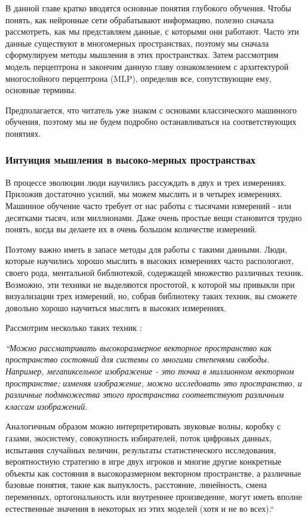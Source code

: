 В данной главе кратко вводятся основные понятия глубокого обучения. 
Чтобы понять, как нейронные сети обрабатывают информацию, 
полезно сначала рассмотреть, как мы представляем данные, 
с которыми они работают. Часто эти данные существуют в многомерных пространствах, 
поэтому мы сначала сформулируем методы мышления в этих пространствах.
Затем рассмотрим модель перцептрона и закончим данную главу ознакомлением с 
архитектурой многослойного перцептрона (MLP), 
определив все, сопутствующие ему, основные термины.

Предполагается, что читатель уже знаком с основами классического машинного обучения, 
поэтому мы не будем подробно останавливаться на соответствующих понятиях.

\subsubsection{Интуиция мышления в высоко-мерных пространствах}

В процессе эволюции люди научились рассуждать в двух и трех измерениях. 
Приложив достаточно усилий, мы можем мыслить и в четырех измерениях. 
Машинное обучение часто требует от нас работы с тысячами измерений - 
или десятками тысяч, или миллионами. Даже очень простые вещи становится 
трудно понять, когда вы делаете их в очень большом количестве измерений.

Поэтому важно иметь в запасе методы для работы с такими данными. 
Люди, которые научились хорошо мыслить в высоких измерениях часто 
распологают, своего рода, ментальной библиотекой, содержащей множество 
различных техник. Возможно, эти техники не выделяются простотой, 
к которой мы привыкли при визуализации трех измерений, но, 
собрав библиотеку таких техник, вы сможете довольно хорошо научиться 
мыслить в высоких измерениях.

Рассмотрим несколько таких техник \cite{ndim_thinking}:

\begin{quoting}
    \itshape
    “Можно рассматривать высокоразмерное векторное пространство как 
    пространство состояний для системы со многими степенями свободы. 
    Например, мегапиксельное изображение - это точка в миллионном 
    векторном пространстве; изменяя изображение, можно исследовать 
    это пространство, и различные подмножества этого пространства 
    соответствуют различным классам изображений.

    Аналогичным образом можно интерпретировать звуковые волны, 
    коробку с газами, экосистему, совокупность избирателей, поток 
    цифровых данных, испытания случайных величин, результаты 
    статистического исследования, вероятностную стратегию в игре 
    двух игроков и многие другие конкретные объекты как состояния 
    в высокоразмерном векторном пространстве, а различные базовые 
    понятия, такие как выпуклость, расстояние, линейность, смена 
    переменных, ортогональность или внутреннее произведение, могут 
    иметь вполне естественные значения в некоторых из этих моделей 
    (хотя и не во всех).“
\end{quoting}

